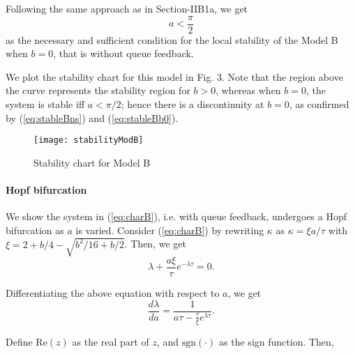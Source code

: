\documentclass[conference]{IEEEtran}
\begin{document}
Following the same approach as in Section-IIB1a, we get
\begin{equation}
\label{eq:stableBb0}
a < \frac{\pi}{2}
\end{equation}
as the necessary and sufficient condition for the local stability of the Model B when $b = 0$, 
that is without queue feedback. 

We plot the stability chart for this model in Fig. 3. Note that the region above the curve represents
the stability region for $b > 0$, whereas when $b = 0$, the system is stable iff $a < \pi/2$; hence there is a discontinuity at $b = 0$, as confirmed by (\ref{eq:stableBns}) and (\ref{eq:stableBb0}).

\begin{figure}
\label{stableB}
\centering
{}
\texttt{[image: stabilityModB]}
\caption{ Stability chart for Model B}
\end{figure}

\paragraph{Hopf bifurcation}

We show the system in (\ref{eq:charB}), i.e. with queue feedback, undergoes a Hopf bifurcation as $a$ is varied. Consider (\ref{eq:charB}) by rewriting $\kappa$ as $\kappa = \xi a/\tau$ with $\xi = 2 + b/4 - \sqrt{b^{2}/16 + b/2}$. Then, we get
\begin{equation}
\label{eq:charA}
\lambda +\frac{a\xi}{\tau} e^{-\lambda\tau} = 0.
\end{equation}

Differentiating the above equation with respect to $a$, we get
\begin{equation}
\frac{d\lambda}{da} = \frac{1}{a\tau - \frac{\tau}{\xi} e^{\lambda\tau}}.
\end{equation}

Define $\text{Re}\left(z\right)$ as the real part of $z$, and $\text{sgn}\left(\cdot\right)$ as the sign function. Then,
\end{document}
